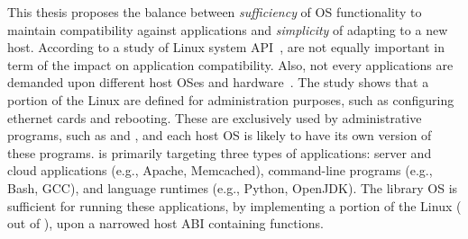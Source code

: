 This thesis proposes the balance %
between {\em sufficiency} of OS functionality to maintain compatibility against applications
and {\em simplicity} of adapting to a new host.
According to
a study of Linux system API~\cite{tsai16apistudy},
\linuxapis{} are not equally important in term of the impact on application compatibility.
Also, not every applications are demanded upon different host OSes and hardware~\cite{ubuntu-popularity}.
The study shows that
a portion of the Linux \linuxapis{} are defined for administration purposes,
such as configuring ethernet cards and rebooting.
These \linuxapis{} are exclusively used by
administrative programs,
such as  and ,
and each host OS is likely to have its own version of these programs.
\graphene{} is primarily targeting three types of applications:
server and cloud applications (e.g., Apache, Memcached), command-line programs (e.g., Bash, GCC), and language runtimes (e.g., Python, OpenJDK).
The \graphene{} library OS is sufficient for running these applications,
by implementing a portion of the Linux \linuxapis{} (\graphenesyscallnum{} out of \linuxsyscallnum{}),
upon a narrowed host ABI containing \palcallnum{} functions.









